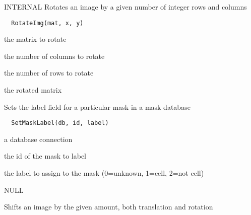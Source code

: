 \documentclass[a4paper]{book}
\begin{document}
%
\begin{Description}\relax
INTERNAL Rotates an image by a given number of integer
rows and columns
\end{Description}
%
\begin{Usage}
\begin{verbatim}
  RotateImg(mat, x, y)
\end{verbatim}
\end{Usage}
%
\begin{Arguments}
\begin{ldescription}
\item[\code{mat}] the matrix to rotate

\item[\code{x}] the number of columns to rotate

\item[\code{y}] the number of rows to rotate
\end{ldescription}
\end{Arguments}
%
\begin{Value}
the rotated matrix
\end{Value}
%
\begin{Description}\relax
Sets the label field for a particular mask in a mask
database
\end{Description}
%
\begin{Usage}
\begin{verbatim}
  SetMaskLabel(db, id, label)
\end{verbatim}
\end{Usage}
%
\begin{Arguments}
\begin{ldescription}
\item[\code{db}] a database connection

\item[\code{id}] the id of the mask to label

\item[\code{label}] the label to assign to the mask (0=unknown,
1=cell, 2=not cell)
\end{ldescription}
\end{Arguments}
%
\begin{Value}
NULL
\end{Value}
%
\begin{Description}\relax
Shifts an image by the given amount, both translation and
rotation
\end{Description}
\end{document}
